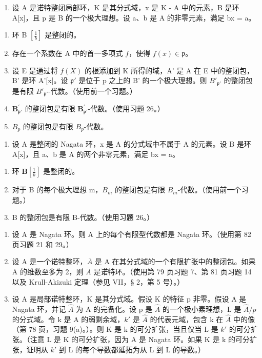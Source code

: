 \begin{enumerate}
\def\labelenumi{\arabic{enumi})}
\setcounter{enumi}{27}
\tightlist
\item
  设 A 是诺特整闭局部环，K 是其分式域，x 是 K - A 中的元素，B 是环 A{[}x{]}，且 p 是 B 的一个极大理想。设 a、b 是 A 的非零元素，满足 bx = a。
\end{enumerate}

\begin{enumerate}
\def\labelenumi{\alph{enumi})}
\item
  环 B \(\left[\frac{1}{b}\right]\) 是整闭的。
\item
  存在一个系数在 A 中的首一多项式 \(f\)，使得 \(f(x)\in\mathfrak{p}\)。
\item
  设 E 是通过将 \(f(X)\) 的根添加到 K 所得的域，A' 是 A 在 E 中的整闭包，B' 是环 A'{[}x{]}。设 \(\mathfrak{p}'\) 是位于 p 之上的 B' 的一个极大理想。则 \(B'_{\mathfrak{p}'}\) 的整闭包是有限 \(B'_{\mathfrak{p}'}\)-代数。（使用前一个习题。）
\item
  \(\mathbf{B}_{\mathfrak{p}'}^{\prime}\) 的整闭包是有限 \(\mathbf{B}_{\mathfrak{p}'}^{\prime}\)-代数。（使用习题 26。）
\item
  \(B_{p}\) 的整闭包是有限 \(B_{p}\)-代数。
\end{enumerate}

\begin{enumerate}
\def\labelenumi{\arabic{enumi})}
\setcounter{enumi}{28}
\tightlist
\item
  设 A 是整闭的 Nagata 环，x 是 A 的分式域中不属于 A 的元素。设 B 是环 A{[}x{]}，且 a、b 是 A 的两个非零元素，满足 bx = a。
\end{enumerate}

\begin{enumerate}
\def\labelenumi{\alph{enumi})}
\item
  环 \(\mathbf{B}\left[\frac{1}{b}\right]\) 是整闭的。
\item
  对于 B 的每个极大理想 m，\(B_{m}\) 的整闭包是有限 \(B_{m}\)-代数。（使用前一个习题。）
\item
  B 的整闭包是有限 B-代数。（使用习题 26。）
\end{enumerate}

\begin{enumerate}
\def\labelenumi{\arabic{enumi})}
\setcounter{enumi}{29}
\item
  设 A 是 Nagata 环。则 A 上的每个有限型代数都是 Nagata 环。（使用第 82 页习题 21 和 29。）
\item
  设 A 是一个诺特整环，\(\overline{A}\) 是 A 在其分式域的一个有限扩张中的整闭包。如果 A 的维数至多为 2，则 \(\overline{A}\) 是诺特环。（使用第 79 页习题 7、第 81 页习题 14 以及 Krull-Akizuki 定理（参见 VII，§ 2，第 5 号）。）
\item
  设 A 是局部诺特整环，K 是其分式域。假设 K 的特征 p 非零。假设 A 是 Nagata 环，并记 \(\hat{A}\) 为 A 的完备化。设 p 是 \(\hat{A}\) 的一个极小素理想，L 是 \(\hat{A}/p\) 的分式域。令 k 是 A 的弱剩余域，\(k'\) 是 \(\hat{A}\) 的代表元域，包含 k 在 \(\hat{A}\) 中的像（第 78 页，习题 9(a)。）。则 K 是 k 的可分扩张，当且仅当 L 是 \(k'\) 的可分扩张。（注意 L 是 K 的可分扩张，因为 A 是 Nagata 环。如果 K 是 k 的可分扩张，证明从 \(k'\) 到 L 的每个导数都延拓为从 L 到 L 的导数。）
\end{enumerate}

